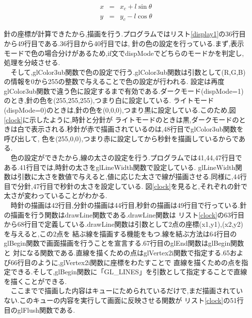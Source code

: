 \documentclass[a4j]{jarticle}
\begin{document}
        \begin{eqnarray}
          \label{posix}
    x &=& x_c + l \sin \theta  \\
          \label{posiy}
    y &=& y_c - l \cos \theta
      \end{eqnarray}
        
      針の座標が計算できたから,描画を行う.プログラムではリスト\ref{display1}の36行目から49行目である.36行目から40行目では,
      針の色の設定を行っている.まず,表示モードで色の場合分けがあるため,if文でdispModeでどちらのモードかを判定し,処理を分岐させる.\\
      　そして,glColor3ub関数で色の設定で行う.glColor3ub関数は引数として(R,G,B)の情報を0から255の整数で与えることで色の設定が行われる.
      設定は再度glColor3ub関数で違う色に設定するまで有効である.ダークモード(dispMode=1)のとき,針の色を(255,255,255),つまり白に設定している.
      ライトモード(dispMode=0)のときは,針の色を(0,0,0),つまり黒に設定している.このため,図\ref{clock}に示したように,時針と分針が
      ライトモードのときは黒,ダークモードのときは白で表示される.秒針が赤で描画されているのは,48行目でglColor3ub関数を呼び出して,
      色を(255,0,0),つまり赤に設定してから秒針を描画しているからである.\\
      　色の設定ができたから,線の太さの設定を行う.プログラムでは41,44,47行目である.41行目では,時針の太さをglLineWidth関数で設定している.
      glLineWidth関数は引数に太さを数値で与えると,値に応じた太さで線が描画させる.同様に,44行目で分針,47行目で秒針の太さを設定している.
      図\ref{clock}を見ると,それぞれの針で太さが変わっていることがわかる.\\
      　時針の描画は42行目,分針の描画は44行目,秒針の描画は49行目で行っている.針の描画を行う関数はdrawLine関数である.drawLine関数は
      リスト\ref{clock}の63行目から68行目で定義している.drawLine関数は引数として2点の座標(x1,y1),(x2,y2)を与えると,この2点を
      結ぶ線を描画する機能をもつ.線を結ぶ方法は64行目のglBegin関数で画面描画を行うことを宣言する.67行目のglEnd関数はglBegin関数と
      対になる関数である.直線を描くための点はglVertex2i関数で指定する.65および66行目のように,glVertex2i関数に座標をわたすことで
      直線を描くための点を指定できる.そして,glBegin関数に「GL\_LINES」を引数として指定することで直線を描くことができる.\\
      　ここまでで描画した内容はキューにためられているだけで,まだ描画されていない.このキューの内容を実行して画面に反映させる関数が
      リスト\ref{clock}の51行目のglFlush関数である.
\end{document}
